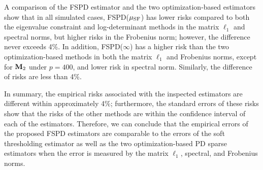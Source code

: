 \documentclass[times,sort&compress,3p]{elsarticle}
\begin{document}
A comparison of the FSPD estimator and the two optimization-based estimators show that in all simulated cases, FSPD($\mu_{\rm SF}$) has
lower risks compared to both the eigenvalue constraint and log-determinant methods in the matrix $\ell_1$ and spectral norms,
but higher risks in the Frobenius norm; however, the difference never exceeds 4\%. In addition, FSPD($\infty$) has
a higher risk than the two optimization-based methods in both the matrix $\ell_1$ and Frobenius norms, except for ${\bf M}_2$
 under $p=400$, and lower risk in spectral norm. Similarly, the difference of risks are less than 4\%.


In summary, the empirical risks associated with the inspected estimators are different within
approximately 4\%; furthermore, the standard errors of these risks show that the risks of the other methods
 are within the confidence interval of each of the estimators. 
Therefore, we can conclude that the empirical
errors of the proposed FSPD estimators are comparable to the errors of the soft thresholding estimator
as well as the two optimization-based PD sparse estimators when the error is measured by the matrix $\ell_1$, spectral,
and Frobenius norms.
\end{document}
